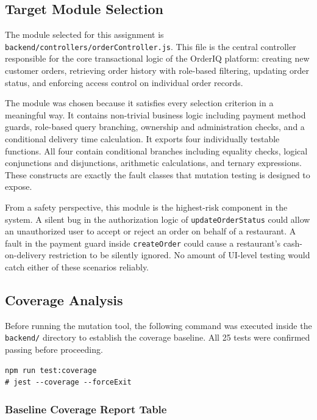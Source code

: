 \documentclass[12pt, a4paper]{article}
\begin{document}
\subsection{Target Module Selection}

The module selected for this assignment is \texttt{backend/controllers/orderController.js}. This file is the central controller responsible for the core transactional logic of the OrderIQ platform: creating new customer orders, retrieving order history with role-based filtering, updating order status, and enforcing access control on individual order records.

The module was chosen because it satisfies every selection criterion in a meaningful way. It contains non-trivial business logic including payment method guards, role-based query branching, ownership and administration checks, and a conditional delivery time calculation. It exports four individually testable functions. All four contain conditional branches including equality checks, logical conjunctions and disjunctions, arithmetic calculations, and ternary expressions. These constructs are exactly the fault classes that mutation testing is designed to expose.

From a safety perspective, this module is the highest-risk component in the system. A silent bug in the authorization logic of \texttt{updateOrderStatus} could allow an unauthorized user to accept or reject an order on behalf of a restaurant. A fault in the payment guard inside \texttt{createOrder} could cause a restaurant's cash-on-delivery restriction to be silently ignored. No amount of UI-level testing would catch either of these scenarios reliably.

\subsection{Coverage Analysis}

Before running the mutation tool, the following command was executed inside the \texttt{backend/} directory to establish the coverage baseline. All 25 tests were confirmed passing before proceeding.

\begin{lstlisting}[caption={Coverage command}]
npm run test:coverage
# jest --coverage --forceExit
\end{lstlisting}

\subsubsection*{Baseline Coverage Report Table}
\end{document}
